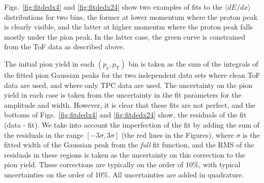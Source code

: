 \documentclass[%
aps, prd, reprint, show pacs, preprint numbers, ams math, amssymb, superscriptaddress, linenumbers]{revtex4-1}
\newcommand{\dedx}{\ensuremath{\langle dE/dx\rangle}\xspace}
\def\pzpt{$(p_\mathrm{z},p_\mathrm{T})$\xspace}
\begin{document}
Figs.~\ref{fig:fitdedx4} and \ref{fig:fitdedx24} show two examples of fits to the \dedx distributions for two bins, the former at lower momentum where the proton peak is clearly visible, and the latter at higher momentm where the proton peak falls mostly under the pion peak.  In the latter case, the green curve is constrained from the ToF data as described above.  

The initial pion yield in each \pzpt bin is taken as the sum of the integrals of the fitted pion Gaussian peaks for the two independent data sets where clean ToF data are used, and where only TPC data are used.  The uncertainty on the pion yield in each case is taken from the uncertainty in the fit parameters for the amplitude and width.  However, it is clear that these fits are not perfect, and the bottoms of Figs.~\ref{fig:fitdedx4} and \ref{fig:fitdedx24} show, the residuals of the fit (data - fit).  We take into account the imperfection of the fit by adding the sum of the residuals in the range $[-3\sigma,3\sigma]$ (the red lines in the Figures), where $\sigma$ is the fitted width of the Gaussian peak from the \emph{full} fit function, and the RMS of the residuals in these regions is taken as the uncertainty on this correction to the pion yield.  These corrections are typically on the order of 10\%, with typical uncertainties on the order of 10\%.  All uncertainties are added in quadrature.
\end{document}
